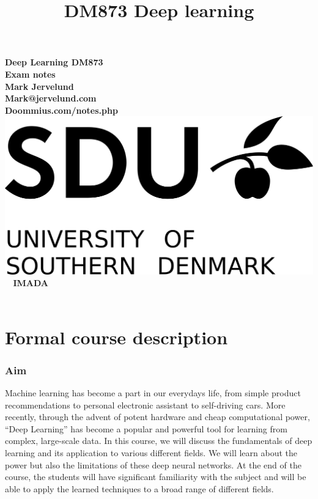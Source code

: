 \documentclass[a4paper,10pt,titlepage]{report}
\date{}
\title{DM873 Deep learning}
\begin{document}
\begin{titlepage}
\centering
    \vspace*{9\baselineskip}
    \huge
    \bfseries
     Deep Learning DM873 \\ Exam notes \\
    \normalfont 
    Mark Jervelund  \\
    Mark@jervelund.com\\
    Doommius.com/notes.php 	\\
    \vspace*{9\baselineskip}
    \normalfont
	\includegraphics[scale=1]{../SDU_logo.png}
    \vfill\ 
    \vspace{5mm}
    IMADA \\

    \textbf{\datedate} \\[2\baselineskip]
\end{titlepage}

\renewcommand{\thepage}{\roman{page}}%
\tableofcontents
\newpage
\setcounter{page}{1}
\renewcommand{\thepage}{\arabic{page}}

\part{Formal course description}

\section{Aim}
Machine learning has become a part in our everydays life, from simple product recommendations to personal electronic assistant to self-driving cars. More recently, through the advent of potent hardware and cheap computational power, “Deep Learning” has become a popular and powerful tool for learning from complex, large-scale data.
In this course, we will discuss the fundamentals of deep learning and its application to various different fields. We will learn about the power but also the limitations of these deep neural networks. At the end of the course, the students will have significant familiarity with the subject and will be able to apply the learned techniques to a broad range of different fields.\\
\vspace{10mm}
\end{document}

